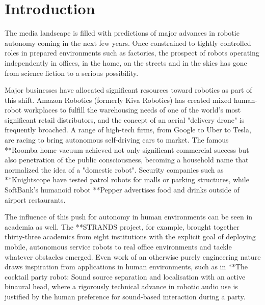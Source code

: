 \documentclass{sfuthesis}
\begin{document}
%
\listoffigures%
\clearpage





%
%

\mainmatter%

\chapter{Introduction}

The media landscape is filled with predictions of major advances in robotic autonomy coming in the next few years. Once constrained to tightly controlled roles in prepared environments such as factories, the prospect of robots operating independently in offices, in the home, on the streets and in the skies has gone from science fiction to a serious possibility.

Major businesses have allocated significant resources toward robotics as part of this shift. Amazon Robotics (formerly Kiva Robotics) has created mixed human-robot workplaces to fulfill the warehousing needs of one of the world's most significant retail distributors, and the concept of an aerial "delivery drone" is frequently broached. A range of high-tech firms, from Google to Uber to Tesla, are racing to bring autonomous self-driving cars to market. The famous **Roomba home vacuum achieved not only significant commercial success but also penetration of the public consciousness, becoming a household name that normalized the idea of a "domestic robot". Security companies such as **Knightscope have tested patrol robots for malls or parking structures, while SoftBank's humanoid robot **Pepper advertises food and drinks outside of airport restaurants.

The influence of this push for autonomy in human environments can be seen in academia as well. The **STRANDS project, for example, brought together thirty-three academics from eight institutions with the explicit goal of deploying mobile, autonomous service robots to real office environments and tackle whatever obstacles emerged. Even work of an otherwise purely engineering nature draws inspiration from applications in human environments, such as in **The cocktail party robot: Sound source separation and localisation with an active binaural head, where a rigorously technical advance in robotic audio use is justified by the human preference for sound-based interaction during a party.
\end{document}
